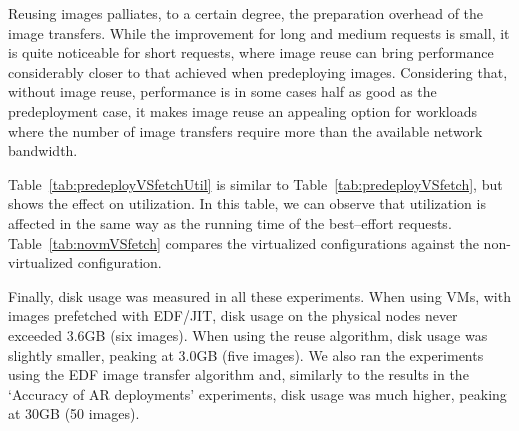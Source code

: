 Reusing images palliates, to a certain degree, the preparation overhead of the image transfers. While the improvement for long and medium requests is small, it is quite noticeable for short requests, where image reuse can bring performance considerably closer to that achieved when predeploying images. Considering that, without image reuse, performance is in some cases half as good as the predeployment case, it makes image reuse an appealing option for workloads where the number of image transfers require more than the available network bandwidth.

Table~\ref{tab:predeployVSfetchUtil} is similar to Table~\ref{tab:predeployVSfetch}, but shows the effect on utilization. In this table, we can observe that utilization is affected in the same way as the running time of the best--effort requests. Table~\ref{tab:novmVSfetch} compares the virtualized configurations against the non-virtualized configuration.

Finally, disk usage was measured in all these experiments. When using VMs, with images prefetched with EDF/JIT, disk usage on the physical nodes never exceeded 3.6GB (six images). When using the reuse algorithm, disk usage was slightly smaller, peaking at 3.0GB (five images). We also ran the experiments using the EDF image transfer algorithm and, similarly to the results in the `Accuracy of AR deployments' experiments, disk usage was much higher, peaking at 30GB (50 images).

